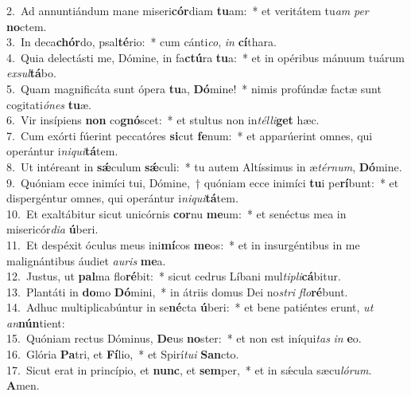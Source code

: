 {2.~}Ad annuntiándum mane miseri\textbf{cór}diam \textbf{tu}am:~* et veritátem tu\textit{am} \textit{per} \textbf{no}ctem.\\
{3.~}In deca\textbf{chór}do, psal\textbf{té}rio:~* cum cánti\textit{co}, \textit{in} \textbf{cí}thara.\\
{4.~}Quia delectásti me, Dómine, in fa\textbf{ctú}ra \textbf{tu}a:~* et in opéribus mánuum tuárum \textit{ex}\textit{sul}\textbf{tá}bo.\\
{5.~}Quam magnificáta sunt ópera \textbf{tu}a, \textbf{Dó}mine!~* nimis profúndæ factæ sunt cogitati\textit{ó}\textit{nes} \textbf{tu}æ.\\
{6.~}Vir insípiens \textbf{non} co\textbf{gnó}scet:~* et stultus non in\textit{tél}\textit{li}\textbf{get} hæc.\\
{7.~}Cum exórti fúerint peccatóres \textbf{si}cut \textbf{fe}num:~* et apparúerint omnes, qui operántur i\textit{ni}\textit{qui}\textbf{tá}tem.\\
{8.~}Ut intéreant in \textbf{sǽ}culum \textbf{sǽ}culi:~* tu autem Altíssimus in æ\textit{tér}\textit{num}, \textbf{Dó}mine.\\
{9.~}Quóniam ecce inimíci tui, Dómine,~† quóniam ecce inimíci \textbf{tu}i pe\textbf{rí}bunt:~* et dispergéntur omnes, qui operántur i\textit{ni}\textit{qui}\textbf{tá}tem.\\
{10.~}Et exaltábitur sicut unicórnis \textbf{cor}nu \textbf{me}um:~* et senéctus mea in misericór\textit{di}\textit{a} \textbf{ú}beri.\\
{11.~}Et despéxit óculus meus ini\textbf{mí}cos \textbf{me}os:~* et in insurgéntibus in me malignántibus áudiet \textit{au}\textit{ris} \textbf{me}a.\\
{12.~}Justus, ut \textbf{pal}ma flo\textbf{ré}bit:~* sicut cedrus Líbani mul\textit{ti}\textit{pli}\textbf{cá}bitur.\\
{13.~}Plantáti in \textbf{do}mo \textbf{Dó}mini,~* in átriis domus Dei no\textit{stri} \textit{flo}\textbf{ré}bunt.\\
{14.~}Adhuc multiplicabúntur in se\textbf{né}cta \textbf{ú}beri:~* et bene patiéntes erunt, \textit{ut} \textit{an}\textbf{nún}tient:\\
{15.~}Quóniam rectus Dóminus, \textbf{De}us \textbf{no}ster:~* et non est iníqui\textit{tas} \textit{in} \textbf{e}o.\\
{16.~}Glória \textbf{Pa}tri, et \textbf{Fí}lio,~* et Spirí\textit{tu}\textit{i} \textbf{San}cto.\\
{17.~}Sicut erat in princípio, et \textbf{nunc}, et \textbf{sem}per,~* et in sǽcula sæcu\textit{ló}\textit{rum}. \textbf{A}men.\\
